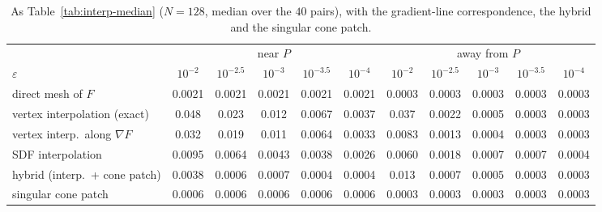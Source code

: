 \documentclass[12pt, a4paper, oneside]{book}
\theoremstyle{plain}
\theoremstyle{definition}
\theoremstyle{remark}
\theoremstyle{definition}
\begin{document}
\begin{table}[!ht]
\centering
\small
\begin{adjustbox}{max width=\textwidth}
\begin{tabular}{l c c c c c c c c c c}
\toprule
& \multicolumn{5}{c}{near $P$} & \multicolumn{5}{c}{away from $P$} \\
\cmidrule(lr){2-6}\cmidrule(lr){7-11}
$\varepsilon$ & $10^{-2}$ & $10^{-2.5}$ & $10^{-3}$ & $10^{-3.5}$ & $10^{-4}$ & $10^{-2}$ & $10^{-2.5}$ & $10^{-3}$ & $10^{-3.5}$ & $10^{-4}$ \\
\midrule
direct mesh of $F$ & 0.0021 & 0.0021 & 0.0021 & 0.0021 & 0.0021 & 0.0003 & 0.0003 & 0.0003 & 0.0003 & 0.0003 \\
vertex interpolation (exact) & 0.048 & 0.023 & 0.012 & 0.0067 & 0.0037 & 0.037 & 0.0022 & 0.0005 & 0.0003 & 0.0003 \\
vertex interp.\ along $\nabla F$ & 0.032 & 0.019 & 0.011 & 0.0064 & 0.0033 & 0.0083 & 0.0013 & 0.0004 & 0.0003 & 0.0003 \\
SDF interpolation & 0.0095 & 0.0064 & 0.0043 & 0.0038 & 0.0026 & 0.0060 & 0.0018 & 0.0007 & 0.0007 & 0.0004 \\
hybrid (interp.\ + cone patch) & 0.0038 & 0.0006 & 0.0007 & 0.0004 & 0.0004 & 0.013 & 0.0007 & 0.0005 & 0.0003 & 0.0003 \\
singular cone patch & 0.0006 & 0.0006 & 0.0006 & 0.0006 & 0.0006 & 0.0003 & 0.0003 & 0.0003 & 0.0003 & 0.0003 \\
\bottomrule
\end{tabular}
\end{adjustbox}
\caption[Reconstructions including the cone patch: median errors]{As
Table~\ref{tab:interp-median} ($N=128$, median over the $40$ pairs), with the
gradient-line correspondence, the hybrid and the singular cone patch.}
\label{tab:cone-median}
\end{table}
\end{document}
